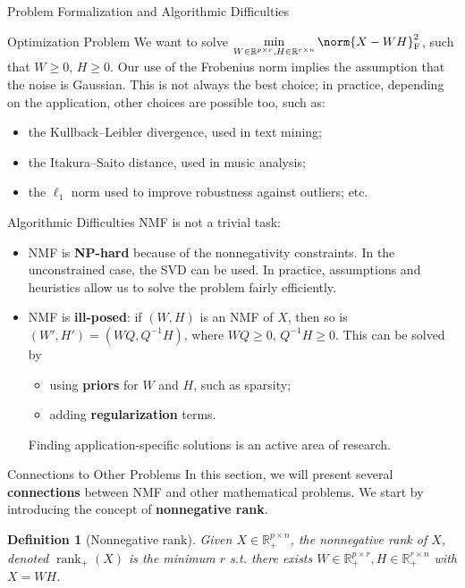 \documentclass[final]{beamer}
\newlength{\onecolwid}
\newtheorem{defn}[thm]{Definition}
\newcommand{\real}{\mathbb{R}}
\DeclareMathOperator{\rank}{rank}
\begin{document}
\begin{frame}
\begin{columns}[t]
\begin{column}{\onecolwid}
\begin{exampleblock}{Problem Formalization and Algorithmic Difficulties}
\vspace{0.4cm}
\begin{block}{Optimization Problem}
We want to solve \(\displaystyle \min_{W \in \real^{p \times r}, H \in \real^{r \times n}} \norm{X - WH}^2_{\textnormal{F}}\), such that \(W \geqslant 0\), \(H \geqslant 0\).
Our use of the Frobenius norm implies the assumption that the noise is Gaussian.
This is not always the best choice; in practice, depending on the application, other choices are possible too, such as:
\begin{itemize}
    \item the Kullback--Leibler divergence, used in text mining;
    \item the Itakura--Saito distance, used in music analysis;
    \item the \(\ell_1\) norm used to improve robustness against outliers; etc.
\end{itemize}
\end{block}
\begin{block}{Algorithmic Difficulties}
NMF is not a trivial task:
\begin{itemize}
    \item NMF is \textbf{NP-hard} because of the nonnegativity constraints.
    In the unconstrained case, the SVD can be used.
    In practice, assumptions and heuristics allow us to solve the problem fairly efficiently.
    \item NMF is \textbf{ill-posed}: if \((W, H)\) is an NMF of \(X\), then so is \((W', H') = (WQ, Q^{-1}H)\), where \(WQ \geqslant 0\), \(Q^{-1}H \geqslant 0\).
    This can be solved by
    \begin{itemize}
        \item using \textbf{priors} for \(W\) and \(H\), such as sparsity;
        \item adding \textbf{regularization} terms.
    \end{itemize}
    Finding application-specific solutions is an active area of research.
\end{itemize}
\end{block}
\end{exampleblock}

\begin{exampleblock}{Connections to Other Problems}
In this section, we will present several \textbf{connections} between NMF and other mathematical problems.
We start by introducing the concept of \textbf{nonnegative rank}.
\begin{defn}[Nonnegative rank]
Given $X \in \mathbb{R}_+^{p\times n}$, the nonnegative rank of \(X\), denoted $\rank_+(X)$ is the minimum $r$ s.t. there exists $W \in \mathbb{R}_+^{p\times r}, H \in \mathbb{R}_+^{r\times n}$ with $X = WH$.
\end{defn}


\end{exampleblock}
\end{column}
\end{columns}
\end{frame}
\end{document}
